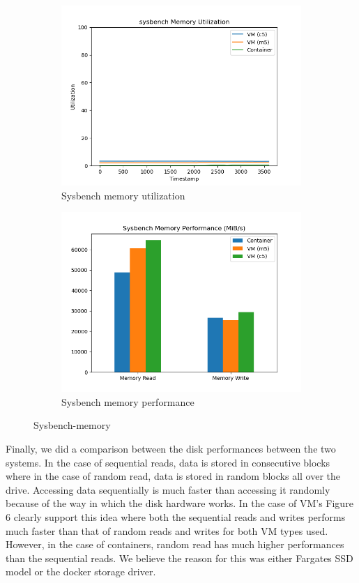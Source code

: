 \documentclass[11pt]{article}
\begin{document}
\begin{figure}[H]
\centering
\begin{subfigure}{.5\textwidth}
  \centering
  \includegraphics[width=1.1\linewidth]{sysbench_mem.png}
  \caption{Sysbench memory utilization}
  \label{fig:sysbm1}
\end{subfigure}%
\begin{subfigure}{.5\textwidth}
  \centering
  \includegraphics[width=1.1\linewidth]{sysbench_mem_bar.png}
  \caption{Sysbench memory performance}
  \label{fig:sysbm2}
\end{subfigure}
\caption{Sysbench-memory}
\label{fig:rubis}
\end{figure}

Finally, we did a comparison between the disk performances between the two systems. In the case of sequential reads, data is stored in consecutive blocks where in the case of random read, data is stored in random blocks all over the drive.  Accessing data sequentially is much faster than accessing it randomly because of the way in which the disk hardware works. In the case of VM's Figure 6 clearly support this idea where both the sequential reads and writes performs much faster than that of random reads and writes for both VM types used. However, in the case of containers, random read has much higher performances than the sequential reads. We believe the reason for this was either Fargates SSD model or the docker storage driver.  
\end{document}
